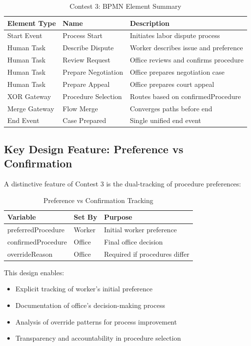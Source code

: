 \documentclass[12pt,a4paper]{article}
\begin{document}
\begin{table}[H]
\centering
\caption{Contest 3: BPMN Element Summary}
\begin{tabular}{llp{6cm}}
\toprule
\textbf{Element Type} & \textbf{Name} & \textbf{Description} \\
\midrule
Start Event & Process Start & Initiates labor dispute process \\
Human Task & Describe Dispute & Worker describes issue and preference \\
Human Task & Review Request & Office reviews and confirms procedure \\
Human Task & Prepare Negotiation & Office prepares negotiation case \\
Human Task & Prepare Appeal & Office prepares court appeal \\
XOR Gateway & Procedure Selection & Routes based on confirmedProcedure \\
Merge Gateway & Flow Merge & Converges paths before end \\
End Event & Case Prepared & Single unified end event \\
\bottomrule
\end{tabular}
\label{tab:contest3_elements}
\end{table}

\subsection{Key Design Feature: Preference vs Confirmation}

A distinctive feature of Contest 3 is the dual-tracking of procedure preferences:

\begin{table}[H]
\centering
\caption{Preference vs Confirmation Tracking}
\begin{tabular}{lll}
\toprule
\textbf{Variable} & \textbf{Set By} & \textbf{Purpose} \\
\midrule
preferredProcedure & Worker & Initial worker preference \\
confirmedProcedure & Office & Final office decision \\
overrideReason & Office & Required if procedures differ \\
\bottomrule
\end{tabular}
\label{tab:preference_tracking}
\end{table}

This design enables:
\begin{itemize}
    \item Explicit tracking of worker's initial preference
    \item Documentation of office's decision-making process
    \item Analysis of override patterns for process improvement
    \item Transparency and accountability in procedure selection
\end{itemize}
\end{document}
